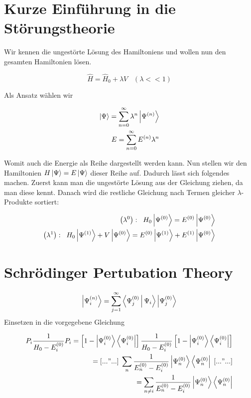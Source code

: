\section*{Kurze Einf\"uhrung in die St\"orungstheorie}

Wir kennen die ungest\"orte L\"osung des Hamiltoniens und wollen nun den gesamten Hamiltonien l\"osen.

\begin{equation}
\hat{H} = \hat{H}_0 + \lambda V \; \; \; \left( \lambda << 1\right)
\end{equation}

Als Ansatz w\"ahlen wir

\begin{align}
\Ket{\Psi} = \sum_{n=0}^{\infty} \lambda^n \Ket{\Psi^{\left( n \right)}} \\
E = \sum_{n=0}^{\infty} E^{\left( n \right)} \lambda^n
\end{align}

Womit auch die Energie als Reihe dargestellt werden kann. Nun stellen wir den Hamiltonien $H \Ket{\Psi} = E \Ket{\Psi}$  dieser Reihe auf. Dadurch l\"asst sich folgendes machen. Zuerst kann man die ungest\"orte L\"osung aus der Gleichung ziehen, da man diese kennt. Danach wird die restliche Gleichung nach Termen gleicher $\lambda$-Produkte sortiert:

\begin{align}
\left(\lambda^0 \right): \; \; H_0 \Ket{\Psi^{\left( 0 \right)}} = E^{\left( 0 \right)} \Ket{\Psi^{\left( 0 \right)}} \\
\left(\lambda^1 \right): \; \; H_0 \Ket{\Psi^{\left( 1 \right)}} + V \Ket{\Psi^{\left( 0 \right)}} = E^{\left( 0 \right)} \Ket{\Psi^{\left( 1 \right)}} + E^{\left( 1 \right)} \Ket{\Psi^{\left( 0 \right)}}
\end{align}

\section{Schr\"odinger Pertubation Theory}

\begin{equation}
\Ket{\Psi_i^{\left( n \right)}} = \sum_{j=1}^{\infty} \Braket{\Psi_j^{\left( 0 \right)} | \Psi_i} \Ket{\Psi_j^{\left( 0 \right)}}
\end{equation}
Einsetzen in die vorgegebene Gleichung

\begin{align}
P_i \frac{1}{H_0 - E_i^{\left( 0 \right)}} P_i = \left[ 1 - \Ket{\Psi_i^{\left( 0 \right)}} \Bra{\Psi_i^{\left( 0 \right)}} \right] \frac{1}{H_0 - E_i^{\left( 0 \right)}} \left[ 1 - \Ket{\Psi_i^{\left( 0 \right)}} \Bra{\Psi_i^{\left( 0 \right)}} \right] \\
= \left[ ..."... \right] \; \sum_n \frac{1}{E_n^{\left( 0 \right)} - E_i^{\left( 0 \right)}} \Ket{\Psi_n^{\left( 0 \right)}} \Bra{\Psi_n^{\left( 0 \right)}} \; \left[ ..."... \right] \\
= \sum_{n \neq i} \frac{1}{E_n^{\left( 0 \right)} - E_i^{\left( 0 \right)}} \Ket{\Psi_n^{\left( 0 \right)}} \Bra{\Psi_n^{\left( 0 \right)}}
\end{align}

